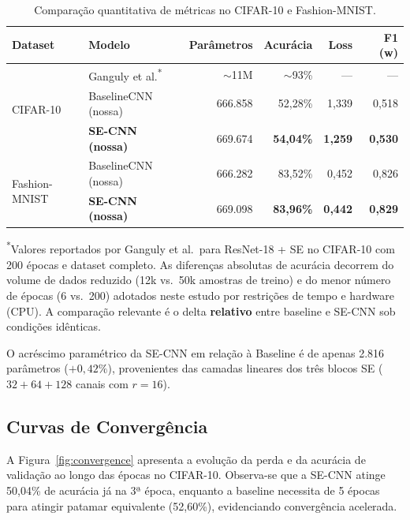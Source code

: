 \documentclass[runningheads]{llncs}
\begin{document}
\begin{table}[H]
\centering
\caption{Comparação quantitativa de métricas no CIFAR-10 e Fashion-MNIST.}
\label{tab:results}
\begin{tabular}{@{} l l r r r r @{}}
\toprule
\textbf{Dataset} & \textbf{Modelo} & \textbf{Parâmetros} &
  \textbf{Acurácia} & \textbf{Loss} & \textbf{F1 (w)} \\
\midrule
\multirow{3}{*}{CIFAR-10}
  & Ganguly et al.\textsuperscript{*} & $\sim$11M & $\sim$93\% & --- & --- \\
  & BaselineCNN (nossa) & 666.858 & 52,28\% & 1,339 & 0,518 \\
  & \textbf{SE-CNN (nossa)} & 669.674 & \textbf{54,04\%} & \textbf{1,259} & \textbf{0,530} \\
\midrule
\multirow{2}{*}{Fashion-MNIST}
  & BaselineCNN (nossa) & 666.282 & 83,52\% & 0,452 & 0,826 \\
  & \textbf{SE-CNN (nossa)} & 669.098 & \textbf{83,96\%} & \textbf{0,442} & \textbf{0,829} \\
\bottomrule
\end{tabular}

\vspace{4pt}
{\footnotesize \textsuperscript{*}Valores reportados por Ganguly et al.\
para ResNet-18 + SE no CIFAR-10 com 200 épocas e dataset completo. As
diferenças absolutas de acurácia decorrem do volume de dados reduzido
(12k vs.\ 50k amostras de treino) e do menor número de épocas (6 vs.\
200) adotados neste estudo por restrições de tempo e hardware (CPU).
A comparação relevante é o delta \textbf{relativo} entre baseline e
SE-CNN sob condições idênticas.}
\end{table}

O acréscimo paramétrico da SE-CNN em relação à Baseline é de apenas
2.816 parâmetros ($+0{,}42\%$), provenientes das camadas lineares dos
três blocos SE ($32 + 64 + 128$ canais com $r = 16$).

\subsection{Curvas de Convergência}

A Figura~\ref{fig:convergence} apresenta a evolução da perda e da
acurácia de validação ao longo das épocas no CIFAR-10. Observa-se que a
SE-CNN atinge 50,04\% de acurácia já na 3ª época, enquanto a baseline
necessita de 5 épocas para atingir patamar equivalente (52,60\%),
evidenciando convergência acelerada.
\end{document}
